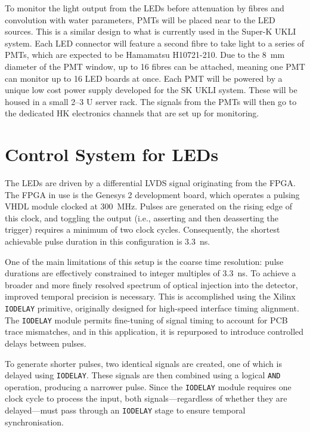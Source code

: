 \documentclass[a4paper,11pt]{article}
\begin{document}
To monitor the light output from the LEDs before attenuation by fibres and convolution with water parameters, PMTs will be placed near to the LED sources. This is a similar design to what is currently used in the Super-K UKLI system. Each LED connector will feature a second fibre to take light to a series of PMTs, which are expected to be Hamamatsu H10721-210. Due to the 8~mm diameter of the PMT window, up to 16 fibres can be attached, meaning one PMT can monitor up to 16 LED boards at once. Each PMT will be powered by a unique low cost power supply developed for the SK UKLI system. These will be housed in a small 2--3 U server rack. The signals from the PMTs will then go to the dedicated HK electronics channels that are set up for monitoring.

\section{Control System for LEDs}\label{sec:LEDcontrol}

The LEDs are driven by a differential LVDS signal originating from the FPGA. The FPGA in use is the Genesys 2 \cite{Genesys2} development board, which operates a pulsing VHDL module clocked at \SI{300}{\mega\hertz}. Pulses are generated on the rising edge of this clock, and toggling the output (i.e., asserting and then deasserting the trigger) requires a minimum of two clock cycles. Consequently, the shortest achievable pulse duration in this configuration is 3.3~ns.

One of the main limitations of this setup is the coarse time resolution: pulse durations are effectively constrained to integer multiples of \SI{3.3}{\nano\second}. To achieve a broader and more finely resolved spectrum of optical injection into the detector, improved temporal precision is necessary. This is accomplished using the Xilinx \texttt{IODELAY} primitive, originally designed for high-speed interface timing alignment. The \texttt{IODELAY} module permits fine-tuning of signal timing to account for PCB trace mismatches, and in this application, it is repurposed to introduce controlled delays between pulses.

To generate shorter pulses, two identical signals are created, one of which is delayed using \texttt{IODELAY}. These signals are then combined using a logical \texttt{AND} operation, producing a narrower pulse. Since the \texttt{IODELAY} module requires one clock cycle to process the input, both signals—regardless of whether they are delayed—must pass through an \texttt{IODELAY} stage to ensure temporal synchronisation.
\end{document}
